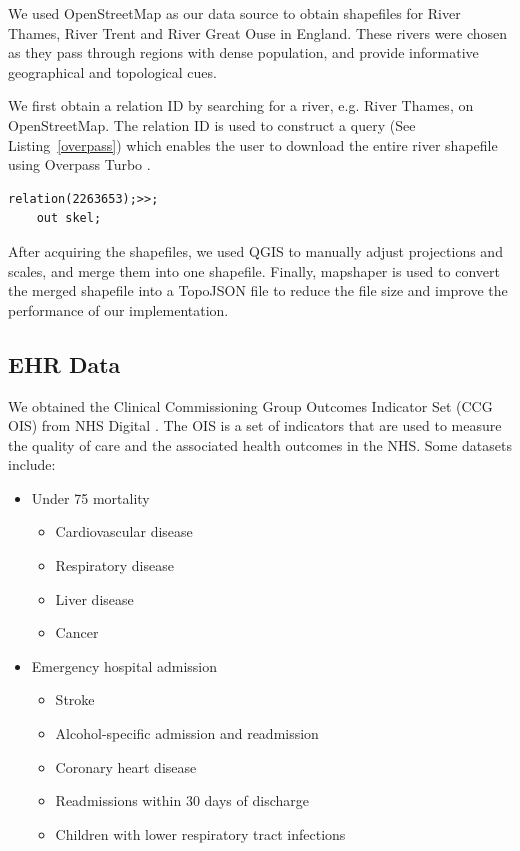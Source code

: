 
We used OpenStreetMap \cite{openstreetmapRelation} as our data source to obtain shapefiles for River Thames, River Trent and River Great Ouse in England. These rivers were chosen as they pass through regions with dense population, and provide informative geographical and topological cues. 

We first obtain a relation ID by searching for a river, e.g. River Thames, on OpenStreetMap. The relation ID is used to construct a query (See Listing~\ref{overpass}) which enables the user to download the entire river shapefile using Overpass Turbo \cite{overpassturboOverpass}.

\begin{lstlisting}[caption={The query that downloads the shapefile of River Thames from OpenStreetMap via the Overpass Turbo API.}, label={overpass},captionpos=b]
    relation(2263653);>>;
    out skel;
\end{lstlisting}

After acquiring the shapefiles, we used QGIS \cite{qgisWelcome} to manually adjust projections and scales, and merge them into one shapefile. Finally, mapshaper \cite{blochMapshaper} is used to convert the merged shapefile into a TopoJSON \cite{TopoJSON} file to reduce the file size and improve the performance of our implementation.

\subsection{EHR Data}

We obtained the Clinical Commissioning Group Outcomes Indicator Set (CCG OIS) from NHS Digital \cite{nhsdigitalClinical}. The OIS is a set of indicators that are used to measure the quality of care and the associated health outcomes in the NHS. Some datasets include:
\begin{itemize}
    \item Under 75 mortality
    \begin{multicols}{2}
        \begin{itemize}
            \item Cardiovascular disease
            \item Respiratory disease
            \item Liver disease
            \item Cancer
        \end{itemize}
    \end{multicols}
    \item Emergency hospital admission
        \begin{itemize}
            \item Stroke
            \item Alcohol-specific admission and readmission
            \item Coronary heart disease
            \item Readmissions within 30 days of discharge
            \item Children with lower respiratory tract infections
        \end{itemize}
\end{itemize}

